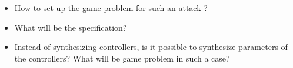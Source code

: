 \begin{itemize}
    \item How to set up the game problem for such an attack ? 
    \item What will be the specification? 
    \item Instead of synthesizing controllers, is it possible to synthesize parameters of the controllers? What will be game problem in such a case? 
\end{itemize}

